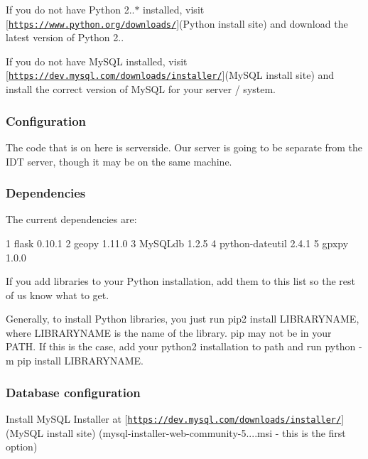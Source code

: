 If you do not have Python 2..$\ast$ installed, visit \mbox{[}\href{https://www.python.org/downloads/}{\tt https\+://www.\+python.\+org/downloads/}\mbox{]}(Python install site) and download the latest version of Python 2..

If you do not have My\+S\+QL installed, visit \mbox{[}\href{https://dev.mysql.com/downloads/installer/}{\tt https\+://dev.\+mysql.\+com/downloads/installer/}\mbox{]}(My\+S\+QL install site) and install the correct version of My\+S\+QL for your server / system.

\subsubsection*{Configuration}

The code that is on here is serverside. Our server is going to be separate from the I\+DT server, though it may be on the same machine.

\subsubsection*{Dependencies}

The current dependencies are\+:


\begin{DoxyCode}
1 flask 0.10.1
2 geopy 1.11.0
3 MySQLdb 1.2.5
4 python-dateutil 2.4.1
5 gpxpy 1.0.0
\end{DoxyCode}


If you add libraries to your Python installation, add them to this list so the rest of us know what to get.

Generally, to install Python libraries, you just run {\ttfamily pip2 install L\+I\+B\+R\+A\+R\+Y\+N\+A\+ME}, where {\ttfamily L\+I\+B\+R\+A\+R\+Y\+N\+A\+ME} is the name of the library. {\ttfamily pip} may not be in your {\ttfamily P\+A\+TH}. If this is the case, add your python2 installation to path and run {\ttfamily python -\/m pip install L\+I\+B\+R\+A\+R\+Y\+N\+A\+ME}.

\subsubsection*{Database configuration}

Install My\+S\+QL Installer at \mbox{[}\href{https://dev.mysql.com/downloads/installer/}{\tt https\+://dev.\+mysql.\+com/downloads/installer/}\mbox{]}(My\+S\+QL install site) (mysql-\/installer-\/web-\/community-\/5....\+msi -\/ this is the first option)

